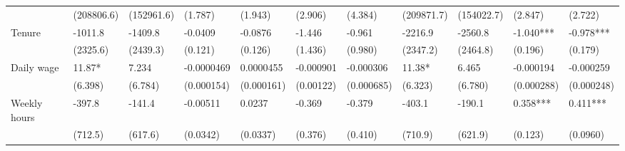 \begin{tabular}{rrrrrrrrrrr}
\multicolumn{1}{l}{} & \multicolumn{1}{l}{(208806.6)} & \multicolumn{1}{l}{(152961.6)} & \multicolumn{1}{l}{(1.787)} & \multicolumn{1}{l}{(1.943)} & \multicolumn{1}{l}{(2.906)} & \multicolumn{1}{l}{(4.384)} & \multicolumn{1}{l}{(209871.7)} & \multicolumn{1}{l}{(154022.7)} & \multicolumn{1}{l}{(2.847)} & \multicolumn{1}{l}{(2.722)} \\
\multicolumn{1}{l}{Tenure} & \multicolumn{1}{l}{-1011.8} & \multicolumn{1}{l}{-1409.8} & \multicolumn{1}{l}{-0.0409} & \multicolumn{1}{l}{-0.0876} & \multicolumn{1}{l}{-1.446} & \multicolumn{1}{l}{-0.961} & \multicolumn{1}{l}{-2216.9} & \multicolumn{1}{l}{-2560.8} & \multicolumn{1}{l}{-1.040***} & \multicolumn{1}{l}{-0.978***} \\
\multicolumn{1}{l}{} & \multicolumn{1}{l}{(2325.6)} & \multicolumn{1}{l}{(2439.3)} & \multicolumn{1}{l}{(0.121)} & \multicolumn{1}{l}{(0.126)} & \multicolumn{1}{l}{(1.436)} & \multicolumn{1}{l}{(0.980)} & \multicolumn{1}{l}{(2347.2)} & \multicolumn{1}{l}{(2464.8)} & \multicolumn{1}{l}{(0.196)} & \multicolumn{1}{l}{(0.179)} \\
\multicolumn{1}{l}{Daily wage} & \multicolumn{1}{l}{11.87*} & \multicolumn{1}{l}{7.234} & \multicolumn{1}{l}{-0.0000469} & \multicolumn{1}{l}{0.0000455} & \multicolumn{1}{l}{-0.000901} & \multicolumn{1}{l}{-0.000306} & \multicolumn{1}{l}{11.38*} & \multicolumn{1}{l}{6.465} & \multicolumn{1}{l}{-0.000194} & \multicolumn{1}{l}{-0.000259} \\
\multicolumn{1}{l}{} & \multicolumn{1}{l}{(6.398)} & \multicolumn{1}{l}{(6.784)} & \multicolumn{1}{l}{(0.000154)} & \multicolumn{1}{l}{(0.000161)} & \multicolumn{1}{l}{(0.00122)} & \multicolumn{1}{l}{(0.000685)} & \multicolumn{1}{l}{(6.323)} & \multicolumn{1}{l}{(6.780)} & \multicolumn{1}{l}{(0.000288)} & \multicolumn{1}{l}{(0.000248)} \\
\multicolumn{1}{l}{Weekly hours} & \multicolumn{1}{l}{-397.8} & \multicolumn{1}{l}{-141.4} & \multicolumn{1}{l}{-0.00511} & \multicolumn{1}{l}{0.0237} & \multicolumn{1}{l}{-0.369} & \multicolumn{1}{l}{-0.379} & \multicolumn{1}{l}{-403.1} & \multicolumn{1}{l}{-190.1} & \multicolumn{1}{l}{0.358***} & \multicolumn{1}{l}{0.411***} \\
\multicolumn{1}{l}{} & \multicolumn{1}{l}{(712.5)} & \multicolumn{1}{l}{(617.6)} & \multicolumn{1}{l}{(0.0342)} & \multicolumn{1}{l}{(0.0337)} & \multicolumn{1}{l}{(0.376)} & \multicolumn{1}{l}{(0.410)} & \multicolumn{1}{l}{(710.9)} & \multicolumn{1}{l}{(621.9)} & \multicolumn{1}{l}{(0.123)} & \multicolumn{1}{l}{(0.0960)} \\

\end{tabular}
